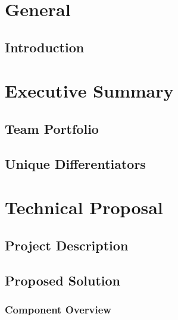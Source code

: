 \documentclass[a4paper]{article}
\begin{document}
	\section{General}
	
		\subsection{Introduction}
	
	\section{Executive Summary}
	
		\subsection{Team Portfolio}
		
		\subsection{Unique Differentiators}
		
	\section{Technical Proposal}
	
		\subsection{Project Description}
		
		\subsection{Proposed Solution}
		
			\subsubsection{Component Overview}
\end{document}
